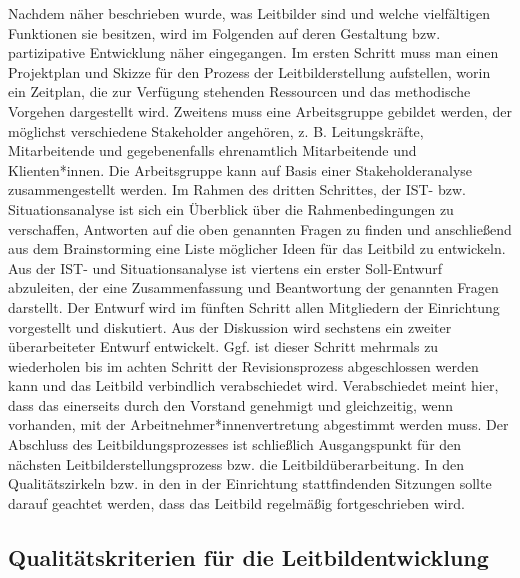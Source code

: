 \documentclass[
  letterpaper,
]{book}
\begin{document}
Nachdem näher beschrieben wurde, was Leitbilder sind und welche
vielfältigen Funktionen sie besitzen, wird im Folgenden auf deren
Gestaltung bzw. partizipative Entwicklung näher eingegangen. Im ersten
Schritt muss man einen Projektplan und Skizze für den Prozess der
Leitbilderstellung aufstellen, worin ein Zeitplan, die zur Verfügung
stehenden Ressourcen und das methodische Vorgehen dargestellt wird.
Zweitens muss eine Arbeitsgruppe gebildet werden, der möglichst
verschiedene Stakeholder angehören, z. B. Leitungskräfte, Mitarbeitende
und gegebenenfalls ehrenamtlich Mitarbeitende und Klienten*innen. Die
Arbeitsgruppe kann auf Basis einer Stakeholderanalyse zusammengestellt
werden. Im Rahmen des dritten Schrittes, der IST- bzw. Situationsanalyse
ist sich ein Überblick über die Rahmenbedingungen zu verschaffen,
Antworten auf die oben genannten Fragen zu finden und anschließend aus
dem Brainstorming eine Liste möglicher Ideen für das Leitbild zu
entwickeln. Aus der IST- und Situationsanalyse ist viertens ein erster
Soll-Entwurf abzuleiten, der eine Zusammenfassung und Beantwortung der
genannten Fragen darstellt. Der Entwurf wird im fünften Schritt allen
Mitgliedern der Einrichtung vorgestellt und diskutiert. Aus der
Diskussion wird sechstens ein zweiter überarbeiteter Entwurf entwickelt.
Ggf. ist dieser Schritt mehrmals zu wiederholen bis im achten Schritt
der Revisionsprozess abgeschlossen werden kann und das Leitbild
verbindlich verabschiedet wird. Verabschiedet meint hier, dass das
einerseits durch den Vorstand genehmigt und gleichzeitig, wenn
vorhanden, mit der Arbeitnehmer*innenvertretung abgestimmt werden muss.
Der Abschluss des Leitbildungsprozesses ist schließlich Ausgangspunkt
für den nächsten Leitbilderstellungsprozess bzw. die
Leitbildüberarbeitung. In den Qualitätszirkeln bzw. in den in der
Einrichtung stattfindenden Sitzungen sollte darauf geachtet werden, dass
das Leitbild regelmäßig fortgeschrieben wird.

\subsection{Qualitätskriterien für die
Leitbildentwicklung}\label{qualituxe4tskriterien-fuxfcr-die-leitbildentwicklung}
\end{document}
